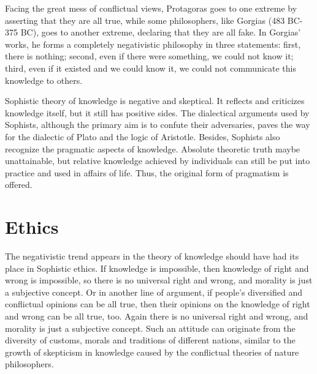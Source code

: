 \documentclass[11pt]{article}
\begin{document}
\newline

Facing the great mess of conflictual views, Protagoras goes to one extreme by asserting that they are all true, while some philosophers, like Gorgias (483 BC-375 BC), goes to another extreme, declaring that they are all fake. 
In Gorgias’ works, he forms a completely negativistic philosophy in three statements: 
first, there is nothing; 
second, even if there were something, we could not know it; 
third, even if it existed and we could know it, we could not communicate this knowledge to others. 

\newline

Sophistic theory of knowledge is negative and skeptical. 
It reflects and criticizes knowledge itself, but it still has positive sides. 
The dialectical arguments used by Sophists, although the primary aim is to confute their adversaries, paves the way for the dialectic of Plato and the logic of Aristotle. 
Besides, Sophists also recognize the pragmatic aspects of knowledge. 
Absolute theoretic truth maybe unattainable, but relative knowledge achieved by individuals can still be put into practice and used in affairs of life. 
Thus, the original form of pragmatism is offered.

\section{Ethics}
The negativistic trend appears in the theory of knowledge should have had its place in Sophistic ethics. 
If knowledge is impossible, then knowledge of right and wrong is impossible, so there is no universal right and wrong, and morality is just a subjective concept. 
Or in another line of argument, if people’s diversified and conflictual opinions can be all true, then their opinions on the knowledge of right and wrong can be all true, too. 
Again there is no universal right and wrong, and morality is just a subjective concept. 
Such an attitude can originate from the diversity of customs, morals and traditions of different nations, similar to the growth of skepticism in knowledge caused by the conflictual theories of nature philosophers.

\newline
\end{document}
